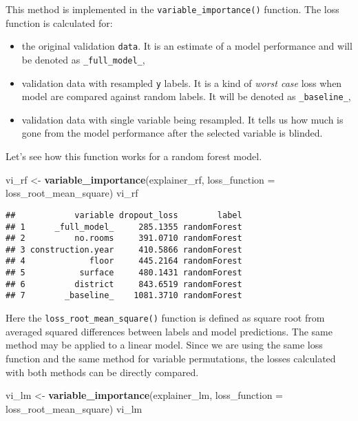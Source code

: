 \documentclass[]{book}
\newenvironment{Shaded}{\begin{snugshade}}{\end{snugshade}}
\newcommand{\DataTypeTok}[1]{\textcolor[rgb]{0.13,0.29,0.53}{#1}}
\newcommand{\KeywordTok}[1]{\textcolor[rgb]{0.13,0.29,0.53}{\textbf{#1}}}
\newcommand{\NormalTok}[1]{#1}
\newcommand{\StringTok}[1]{\textcolor[rgb]{0.31,0.60,0.02}{#1}}
\providecommand{\tightlist}{%
  \setlength{\itemsep}{0pt}\setlength{\parskip}{0pt}}
\theoremstyle{definition}
\theoremstyle{definition}
\theoremstyle{definition}
\theoremstyle{remark}
\begin{document}
This method is implemented in the \texttt{variable\_importance()}
function. The loss function is calculated for:

\begin{itemize}
\tightlist
\item
  the original validation \texttt{data}. It is an estimate of a model
  performance and will be denoted as \texttt{\_full\_model\_},
\item
  validation data with resampled \texttt{y} labels. It is a kind of
  \emph{worst case} loss when model are compared against random labels.
  It will be denoted as \texttt{\_baseline\_},
\item
  validation data with single variable being resampled. It tells us how
  much is gone from the model performance after the selected variable is
  blinded.
\end{itemize}

Let's see how this function works for a random forest model.

\begin{Shaded}
\begin{Highlighting}[]
\NormalTok{vi_rf <-}\StringTok{ }\KeywordTok{variable_importance}\NormalTok{(explainer_rf, }\DataTypeTok{loss_function =}\NormalTok{ loss_root_mean_square)}
\NormalTok{vi_rf}
\end{Highlighting}
\end{Shaded}

\begin{verbatim}
##            variable dropout_loss        label
## 1      _full_model_     285.1355 randomForest
## 2          no.rooms     391.0710 randomForest
## 3 construction.year     410.5866 randomForest
## 4             floor     445.2164 randomForest
## 5           surface     480.1431 randomForest
## 6          district     843.6519 randomForest
## 7        _baseline_    1081.3710 randomForest
\end{verbatim}

{Here the \texttt{loss\_root\_mean\_square()} function is defined as
square root from averaged squared differences between labels and model
predictions. } The same method may be applied to a linear model. Since
we are using the same loss function and the same method for variable
permutations, the losses calculated with both methods can be directly
compared.

\begin{Shaded}
\begin{Highlighting}[]
\NormalTok{vi_lm <-}\StringTok{ }\KeywordTok{variable_importance}\NormalTok{(explainer_lm, }\DataTypeTok{loss_function =}\NormalTok{ loss_root_mean_square)}
\NormalTok{vi_lm}
\end{Highlighting}
\end{Shaded}
\end{document}
